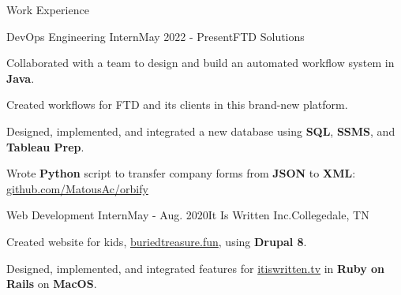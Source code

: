 \begin{rSection}{Work Experience}
  \begin{job}{DevOps Engineering Intern}{May 2022 - Present}{FTD Solutions}{}
    \item Collaborated with a team to design and build an automated workflow system in {\bf Java}.
    \item Created workflows for FTD and its clients in this brand-new platform.
    \item Designed, implemented, and integrated a new database using {\bf SQL}, {\bf SSMS}, and {\bf Tableau Prep}.
    \item Wrote {\bf Python} script to transfer company forms from {\bf JSON} to {\bf XML}: \href{https://github.com/MatousAc/orbify}{github.com/MatousAc/orbify}
  \end{job}



  \begin{job}{Web Development Intern}{May - Aug. 2020}{It Is Written Inc.}{Collegedale, TN}
    \item Created website for kids, \href{https://buriedtreasure.fun/}{buriedtreasure.fun}, using {\bf Drupal 8}.
    \item Designed, implemented, and integrated features for \href{https://itiswritten.tv}{itiswritten.tv} in {\bf Ruby on Rails} on {\bf MacOS}.
  \end{job}
\end{rSection}
